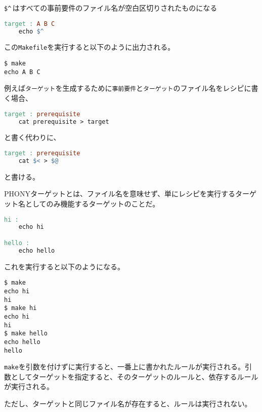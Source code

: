 
\texttt{\${\textasciicircum}}\,はすべての事前要件のファイル名が空白区切りされたものになる

\begin{lstlisting}[language=make]
target : A B C
    echo $^
\end{lstlisting}

この\texttt{Makefile}を実行すると以下のように出力される。

\begin{lstlisting}[style=terminal]
$ make
echo A B C
\end{lstlisting}


例えば\texttt{ターゲット}を生成するために\texttt{事前要件}と\texttt{ターゲット}のファイル名をレシピに書く場合、
\begin{lstlisting}[language=make]
target : prerequisite
    cat prerequisite > target
\end{lstlisting}
と書く代わりに、
\begin{lstlisting}[language=make]
target : prerequisite
    cat $< > $@
\end{lstlisting}
と書ける。


PHONYターゲットとは、ファイル名を意味せず、単にレシピを実行するターゲット名としてのみ機能するターゲットのことだ。

\begin{lstlisting}[language=make]
hi :
    echo hi

hello :
    echo hello
\end{lstlisting}

これを実行すると以下のようになる。

\begin{lstlisting}[style=terminal]
$ make
echo hi
hi
$ make hi
echo hi
hi
$ make hello
echo hello
hello
\end{lstlisting}

\texttt{make}を引数を付けずに実行すると、一番上に書かれたルールが実行される。引数としてターゲットを指定すると、そのターゲットのルールと、依存するルールが実行される。

ただし、ターゲットと同じファイル名が存在すると、ルールは実行されない。

